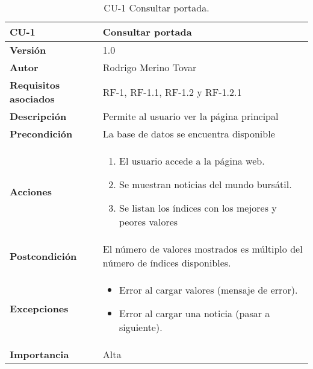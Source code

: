 \begin{table}[p]
	\centering
	\begin{tabularx}{\linewidth}{ p{} p{} }
		\toprule
		\textbf{CU-1}    & \textbf{Consultar portada}\\
		\toprule
		\textbf{Versión}              & 1.0    \\
		\textbf{Autor}                & Rodrigo Merino Tovar \\
		\textbf{Requisitos asociados} & RF-1, RF-1.1, RF-1.2 y RF-1.2.1 \\
		\textbf{Descripción}          & Permite al usuario ver la página principal\\
		\textbf{Precondición}         & La base de datos se encuentra disponible \\
		\textbf{Acciones}             &
		\begin{enumerate}
			\def\labelenumi{\arabic{enumi}.}
			\tightlist
			\item El usuario accede a la página web.
			\item Se muestran noticias del mundo bursátil. 
			\item Se listan los índices con los mejores y peores valores
		\end{enumerate}\\
		\textbf{Postcondición}        & El número de valores mostrados es múltiplo del 
										número de índices disponibles.  \\
		\textbf{Excepciones}          & 
		\begin{itemize}
			\tightlist
			\item Error al cargar valores (mensaje de error).
			\item Error al cargar una noticia (pasar a siguiente). 
		\end{itemize}\\
		\textbf{Importancia}          & Alta \\
		\bottomrule
	\end{tabularx}
	\caption{CU-1 Consultar portada.}
\end{table}


